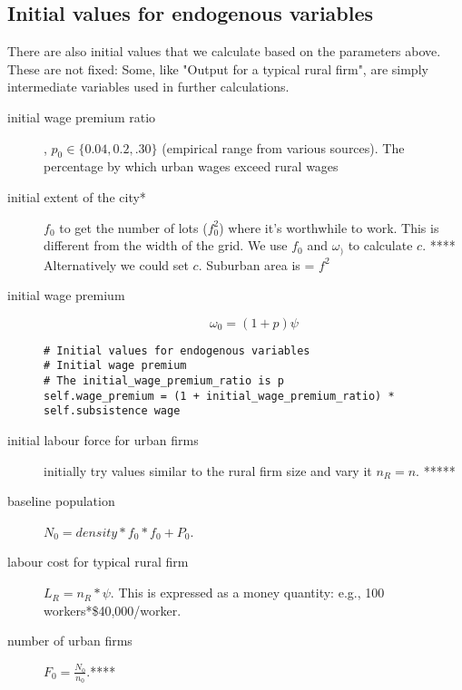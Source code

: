 \subsection{Initial values for endogenous variables} \label{sec-init-value-list}

There are also  initial  values that we calculate based on the parameters above. These are not fixed: Some, like "Output for a typical rural firm", are simply intermediate variables used in further calculations.%

\begin{description}

\item  [initial wage premium ratio], $p_0\in\{0.04,0.2,.30\}$ (empirical range from various sources). The percentage by which urban wages exceed rural wages 

\item  [initial extent of the city*] $f_0$ to get the number of lots ($f_0^2$) where it's worthwhile to work. This is different from the width of the grid. We use $f_0$ and $\omega_)$ to calculate $c$. **** Alternatively we could set  $c$. Suburban area is  = $f^2$ 

\item  [initial wage premium ]  \[\omega_0=(1+p)\psi\]

\begin{lstlisting}
# Initial values for endogenous variables
# Initial wage premium
# The initial_wage_premium_ratio is p
self.wage_premium = (1 + initial_wage_premium_ratio) * self.subsistence wage
\end{lstlisting}

\item[initial labour force for urban firms] initially try values similar to the rural firm size and vary it $n_R=n$. *****%

\item [baseline population] $N_0=density * f_0 * f_0 + P_0$.

\item[labour cost for typical rural firm] $L_R = n_R*\psi$. This is expressed as a money quantity: e.g., 100 workers*\$40,000/worker.  


\item[number of urban firms] $F_0=\frac{N_0}{n_0}$.****


\end{description}
